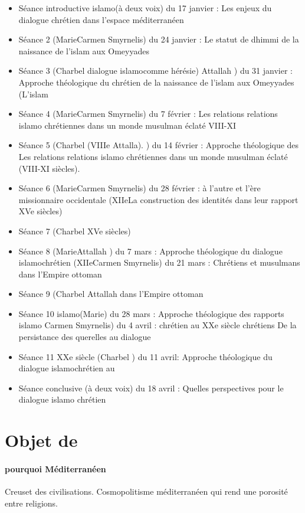 \begin{itemize}
    \item Séance introductive islamo(à deux voix) du 17 janvier : Les enjeux du dialogue chrétien dans l’espace méditerranéen     \item Séance 2 (MarieCarmen Smyrnelis) du 24 janvier : Le statut de dhimmi de la naissance de l’islam aux Omeyyades     \item Séance 3 (Charbel dialogue islamocomme hérésie) Attallah ) du 31 janvier : Approche théologique du chrétien de la naissance de l’islam aux Omeyyades (L’islam     \item Séance 4 (MarieCarmen Smyrnelis) du 7 février : Les relations relations islamo chrétiennes  dans  un monde musulman éclaté   VIII-XI \item  Séance 5 (Charbel (VIIIe Attalla). ) du 14 février : Approche théologique des Les relations relations islamo chrétiennes  dans  un monde musulman éclaté  (VIII-XI  siècles).

    \item Séance 6 (MarieCarmen Smyrnelis) du 28 février : à l’autre et l’ère missionnaire occidentale (XIIeLa construction des identités dans leur rapport XVe siècles) \item Séance 7 (Charbel XVe siècles) \item Séance 8 (MarieAttallah ) du 7 mars : Approche théologique du dialogue islamochrétien (XIIeCarmen Smyrnelis) du 21 mars : Chrétiens et musulmans dans l’Empire ottoman  \item Séance 9 (Charbel Attallah dans l’Empire ottoman \item Séance 10 islamo(Marie) du 28 mars : Approche théologique des rapports islamo Carmen Smyrnelis) du 4 avril : chrétien au XXe siècle chrétiens De la persistance des querelles au dialogue \item Séance 11 XXe siècle (Charbel ) du 11 avril: Approche théologique du dialogue islamochrétien au \item Séance conclusive  (à deux voix) du 18 avril : Quelles perspectives pour le dialogue islamo chrétien 
\end{itemize}

\section{Objet de \Med}
\paragraph{pourquoi Méditerranéen} Creuset des civilisations. Cosmopolitisme méditerranéen qui rend une porosité entre religions.

